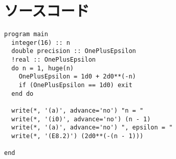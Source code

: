 \appendix
\renewcommand{\lstlistingname}{ソースコード}
\renewcommand*{\thelstlisting}{\Alph{section}.\arabic{lstlisting}}
\section{ソースコード}
\begin{lstlisting}[caption=2-Aのソースコード,label=src2a]
program main
  integer(16) :: n
  double precision :: OnePlusEpsilon
  !real :: OnePlusEpsilon
  do n = 1, huge(n)
    OnePlusEpsilon = 1d0 + 2d0**(-n)
    if (OnePlusEpsilon == 1d0) exit
  end do
  
  write(*, '(a)', advance='no') "n = "
  write(*, '(i0)', advance='no') (n - 1)
  write(*, '(a)', advance='no') ", epsilon = "
  write(*, '(E8.2)') (2d0**(-(n - 1)))

end
\end{lstlisting}